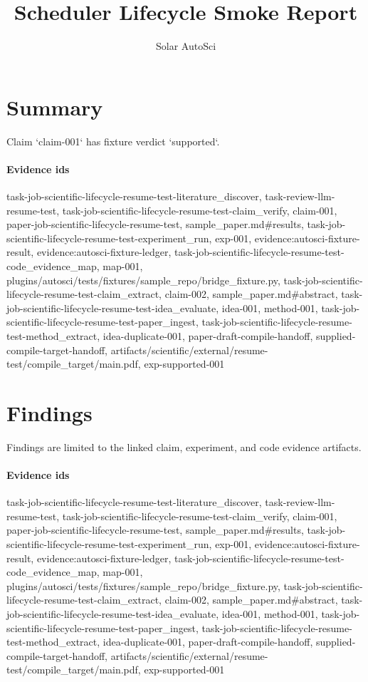 \documentclass{article}
\title{Scheduler Lifecycle Smoke Report}
\author{Solar AutoSci}
\date{}
\begin{document}
\maketitle

\section{Summary}
Claim `claim-001` has fixture verdict `supported`.

\paragraph{Evidence ids} task-job-scientific-lifecycle-resume-test-literature\_discover, task-review-llm-resume-test, task-job-scientific-lifecycle-resume-test-claim\_verify, claim-001, paper-job-scientific-lifecycle-resume-test, sample\_paper.md\#results, task-job-scientific-lifecycle-resume-test-experiment\_run, exp-001, evidence:autosci-fixture-result, evidence:autosci-fixture-ledger, task-job-scientific-lifecycle-resume-test-code\_evidence\_map, map-001, plugins/autosci/tests/fixtures/sample\_repo/bridge\_fixture.py, task-job-scientific-lifecycle-resume-test-claim\_extract, claim-002, sample\_paper.md\#abstract, task-job-scientific-lifecycle-resume-test-idea\_evaluate, idea-001, method-001, task-job-scientific-lifecycle-resume-test-paper\_ingest, task-job-scientific-lifecycle-resume-test-method\_extract, idea-duplicate-001, paper-draft-compile-handoff, supplied-compile-target-handoff, artifacts/scientific/external/resume-test/compile\_target/main.pdf, exp-supported-001

\section{Findings}
Findings are limited to the linked claim, experiment, and code evidence artifacts.

\paragraph{Evidence ids} task-job-scientific-lifecycle-resume-test-literature\_discover, task-review-llm-resume-test, task-job-scientific-lifecycle-resume-test-claim\_verify, claim-001, paper-job-scientific-lifecycle-resume-test, sample\_paper.md\#results, task-job-scientific-lifecycle-resume-test-experiment\_run, exp-001, evidence:autosci-fixture-result, evidence:autosci-fixture-ledger, task-job-scientific-lifecycle-resume-test-code\_evidence\_map, map-001, plugins/autosci/tests/fixtures/sample\_repo/bridge\_fixture.py, task-job-scientific-lifecycle-resume-test-claim\_extract, claim-002, sample\_paper.md\#abstract, task-job-scientific-lifecycle-resume-test-idea\_evaluate, idea-001, method-001, task-job-scientific-lifecycle-resume-test-paper\_ingest, task-job-scientific-lifecycle-resume-test-method\_extract, idea-duplicate-001, paper-draft-compile-handoff, supplied-compile-target-handoff, artifacts/scientific/external/resume-test/compile\_target/main.pdf, exp-supported-001
\end{document}
